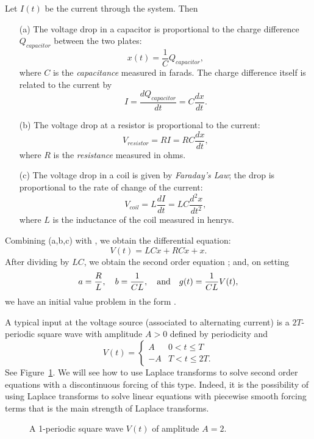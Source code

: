 \documentclass{ximera}
\begin{document}
Let $I(t)$ be the current through the system.  Then 
\begin{itemize}
\item[(a)]  The voltage drop in a capacitor is proportional to the charge 
difference $Q_{capacitor}$ between the two plates:
\[
x(t) = \frac{1}{C}Q_{capacitor},
\]
where $C$ is the {\em capacitance\/} measured in farads.  The charge 
difference itself is related to the current by 
\[
I = \frac{dQ_{capacitor}}{dt} = C\frac{dx}{dt}.
\]
\item[(b)]  The voltage drop at a resistor is proportional to the current:	
\[
V_{resistor} = RI = RC\frac{dx}{dt},
\]
where $R$ is the {\em resistance\/} measured in ohms.
\item[(c)]  The voltage drop in a coil is given by 
{\em Faraday's Law}; 
the drop is proportional to the rate of change of the current:
\[
V_{coil} = L\frac{dI}{dt} = LC\frac{d^2x}{dt^2},
\]
where $L$ is the inductance of the coil measured in henrys.
\end{itemize}

Combining (a,b,c) with , we obtain the differential equation:
\[
V(t) = LC\ddot{x} + RC\dot{x} +  x.
\]
After dividing by $LC$, we obtain the second order equation ;
and, on setting 
\[
a = \frac{R}{L}, \quad b = \frac{1}{CL}, \quad\mbox{and}\quad g(t) = \frac{1}{CL}V(t),
\] 
we have an initial value problem in the form .

A typical input at the voltage source 
(associated to alternating current) is 
a $2T$-periodic square wave with amplitude $A>0$ defined by periodicity and
\[
V(t) = \left\{\begin{array}{rl} A & 0<t\leq T\\
			       -A & T<t\leq 2T.
	\end{array}\right.
\]
See Figure~\ref{fig:sq}.  We will see how to use Laplace transforms to solve 
second order equations with a discontinuous forcing 
of this type.  Indeed,
it is the possibility of using Laplace transforms to solve linear equations 
with piecewise smooth forcing terms that is 
the main strength of Laplace
transforms.

\begin{figure}[htb]
           \centerline{%
           }
           \caption{A 1-periodic square wave $V(t)$ of amplitude $A=2$.}
           \label{fig:sq}
\end{figure}
\end{document}
